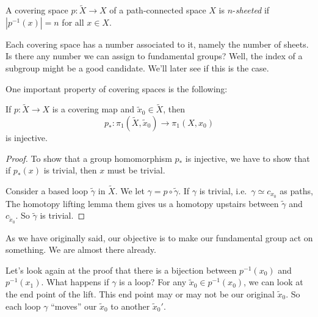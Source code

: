\documentclass[a4paper]{article}
\begin{document}
\begin{defi}[$n$-sheeted]
  A covering space $p: \tilde{X} \to X$ of a path-connected space $X$ is $n$-\emph{sheeted} if $|p^{-1}(x)| = n$ for all $x \in X$.
\end{defi}
Each covering space has a number associated to it, namely the number of sheets. Is there any number we can assign to fundamental groups? Well, the index of a subgroup might be a good candidate. We'll later see if this is the case.

One important property of covering spaces is the following:
\begin{lemma}
  If $p: \tilde{X} \to X$ is a covering map and $\tilde{x}_0 \in \tilde{X}$, then
  \[
    p_*: \pi_1(\tilde{X}, \tilde{x}_0) \to \pi_1(X, x_0)
  \]
  is injective.
\end{lemma}

\begin{proof}
  To show that a group homomorphism $p_*$ is injective, we have to show that if $p_*(x)$ is trivial, then $x$ must be trivial.

  Consider a based loop $\tilde{\gamma}$ in $\tilde{X}$. We let $\gamma = p\circ \tilde{\gamma}$. If $\gamma$ is trivial, i.e.\ $\gamma \simeq c_{x_0}$ as paths, The homotopy lifting lemma them gives us a homotopy upstairs between $\tilde{\gamma}$ and $c_{\tilde{x}_0}$. So $\tilde{\gamma}$ is trivial.
\end{proof}

As we have originally said, our objective is to make our fundamental group act on something. We are almost there already.

Let's look again at the proof that there is a bijection between $p^{-1}(x_0)$ and $p^{-1}(x_1)$. What happens if $\gamma$ is a loop? For any $\tilde{x}_0 \in p^{-1}(x_0)$, we can look at the end point of the lift. This end point may or may not be our original $\tilde{x}_0$. So each loop $\gamma$ ``moves'' our $\tilde{x}_0$ to another $\tilde{x}_0'$.
\end{document}
